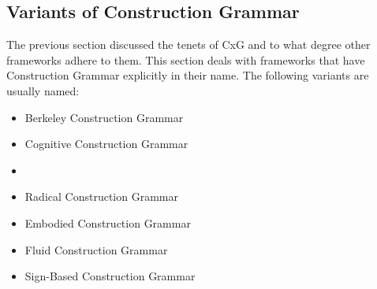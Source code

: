 \documentclass[output=paper]{langsci/langscibook}
\begin{document}
\subsection{Variants of Construction Grammar}

The previous section discussed the tenets of CxG and to what degree other frameworks adhere to them. This
section deals with frameworks that have Construction Grammar explicitly in their name. The following
variants are usually named:
\begin{sloppypar}
\begin{itemize}
\item Berkeley Construction Grammar \citep{Fillmore88a,KF99a,FriedHSK}
\item Cognitive Construction Grammar \citep{Lakoff87a-u,Goldberg95a,Goldberg2006a}
\item {} \citep{Langacker87a-u,Langacker2000a,Langacker2008a-u,Dabrowska2004a}
\item Radical Construction Grammar \citep{Croft2001a}
\item Embodied Construction Grammar \citep{BC2005a}
\item Fluid Construction Grammar \citep{SDB2006a-u,SteelsFluid-ed-not-crossreferenced}
\item Sign-Based Construction Grammar \citep{Sag2010b,Sag2012a}
\end{itemize}
\end{sloppypar}
\end{document}

